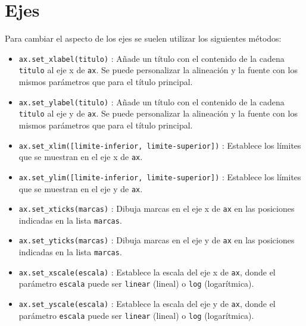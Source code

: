 \documentclass[
  spanish,
  a4paper,
]{scrreport}
\providecommand{\tightlist}{%
  \setlength{\itemsep}{0pt}\setlength{\parskip}{0pt}}
\begin{document}
\section{Ejes}\label{ejes}

Para cambiar el aspecto de los ejes se suelen utilizar los siguientes
métodos:

\begin{itemize}
\tightlist
\item
  \texttt{ax.set\_xlabel(titulo)} : Añade un título con el contenido de
  la cadena \texttt{titulo} al eje x de \texttt{ax}. Se puede
  personalizar la alineación y la fuente con los mismos parámetros que
  para el título principal.
\item
  \texttt{ax.set\_ylabel(titulo)} : Añade un título con el contenido de
  la cadena \texttt{titulo} al eje y de \texttt{ax}. Se puede
  personalizar la alineación y la fuente con los mismos parámetros que
  para el título principal.
\item
  \texttt{ax.set\_xlim({[}limite-inferior,\ limite-superior{]})} :
  Establece los límites que se muestran en el eje x de \texttt{ax}.
\item
  \texttt{ax.set\_ylim({[}limite-inferior,\ limite-superior{]})} :
  Establece los límites que se muestran en el eje y de \texttt{ax}.
\item
  \texttt{ax.set\_xticks(marcas)} : Dibuja marcas en el eje x de
  \texttt{ax} en las posiciones indicadas en la lista \texttt{marcas}.
\item
  \texttt{ax.set\_yticks(marcas)} : Dibuja marcas en el eje y de
  \texttt{ax} en las posiciones indicadas en la lista \texttt{marcas}.
\item
  \texttt{ax.set\_xscale(escala)} : Establece la escala del eje x de
  \texttt{ax}, donde el parámetro \texttt{escala} puede ser
  \texttt{\textquotesingle{}linear\textquotesingle{}} (lineal) o
  \texttt{\textquotesingle{}log\textquotesingle{}} (logarítmica).\\
\item
  \texttt{ax.set\_yscale(escala)} : Establece la escala del eje y de
  \texttt{ax}, donde el parámetro \texttt{escala} puede ser
  \texttt{\textquotesingle{}linear\textquotesingle{}} (lineal) o
  \texttt{\textquotesingle{}log\textquotesingle{}} (logarítmica).
\end{itemize}
\end{document}
